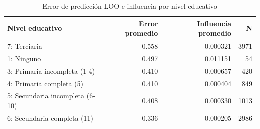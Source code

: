 \begin{table}[ht]
\centering
\begin{tabular}{lrrr}
  \toprule
Nivel educativo & Error promedio & Influencia promedio & N \\ 
  \midrule
7: Terciaria & 0.558 & 0.000321 & 3971 \\ 
  1: Ninguno & 0.497 & 0.011151 & 54 \\ 
  3: Primaria incompleta (1-4) & 0.410 & 0.000657 & 420 \\ 
  4: Primaria completa (5) & 0.410 & 0.000404 & 849 \\ 
  5: Secundaria incompleta (6-10) & 0.408 & 0.000330 & 1013 \\ 
  6: Secundaria completa (11) & 0.336 & 0.000205 & 2986 \\ 
   \bottomrule
\end{tabular}
\caption{Error de predicción LOO e influencia por nivel educativo} 
\label{tab:educ}
\end{table}
